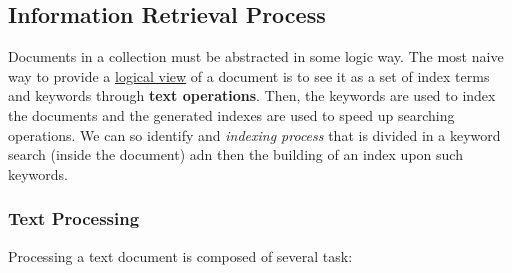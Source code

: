 \documentclass{article}
\begin{document}
		\subsection{Information Retrieval Process}
			Documents in a collection must be abstracted in some logic way. The most naive way to provide a \underline{logical view} of a document is to see it as a set of index terms and keywords through \textbf{text operations}. Then, the keywords are used to index the documents and the generated indexes are used to speed up searching operations. We can so identify and \textit{indexing process} that is divided in a keyword search (inside the document) adn then the building of an index upon such keywords.
			
			\subsubsection{Text Processing}
				Processing a text document is composed of several task:
\end{document}
